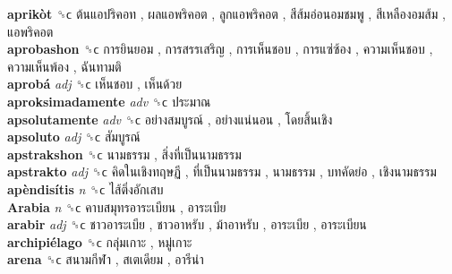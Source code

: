 \textbf{aprikòt} ␝ϲ   ต้นแอปริคอท ,  ผลแอพริคอต ,  ลูกแอพริคอต ,  สีส้มอ่อนอมชมพู ,  สีเหลืองอมส้ม ,  แอพริคอต   \\
\textbf{aprobashon} ␝ϲ   การยินยอม ,  การสรรเสริญ ,  การเห็นชอบ ,  การแซ่ซ้อง ,  ความเห็นชอบ ,  ความเห็นพ้อง ,  ฉันทามติ   \\
\textbf{aprobá} \emph{adj}  ␝ϲ   เห็นชอบ ,  เห็นด้วย   \\
\textbf{aproksimadamente} \emph{adv}  ␝ϲ   ประมาณ   \\
\textbf{apsolutamente} \emph{adv}  ␝ϲ   อย่างสมบูรณ์ ,  อย่างแน่นอน ,  โดยสิ้นเชิง   \\
\textbf{apsoluto} \emph{adj}  ␝ϲ   สัมบูรณ์   \\
\textbf{apstrakshon} ␝ϲ   นามธรรม ,  สิ่งที่เป็นนามธรรม   \\
\textbf{apstrakto} \emph{adj}  ␝ϲ   คิดในเชิงทฤษฏี ,  ที่เป็นนามธรรม ,  นามธรรม ,  บทคัดย่อ ,  เชิงนามธรรม   \\
\textbf{apèndisítis} \emph{n}  ␝ϲ   ไส้ติ่งอักเสบ   \\
\textbf{Arabia} \emph{n}  ␝ϲ   คาบสมุทรอาระเบียน ,  อาระเบีย   \\
\textbf{arabir} \emph{adj}  ␝ϲ   ชาวอาระเบีย ,  ชาวอาหรับ ,  ม้าอาหรับ ,  อาระเบีย ,  อาระเบียน   \\
\textbf{archipiélago} ␝ϲ   กลุ่มเกาะ ,  หมู่เกาะ   \\
\textbf{arena} ␝ϲ   สนามกีฬา ,  สเตเดียม ,  อารีน่า   \\
